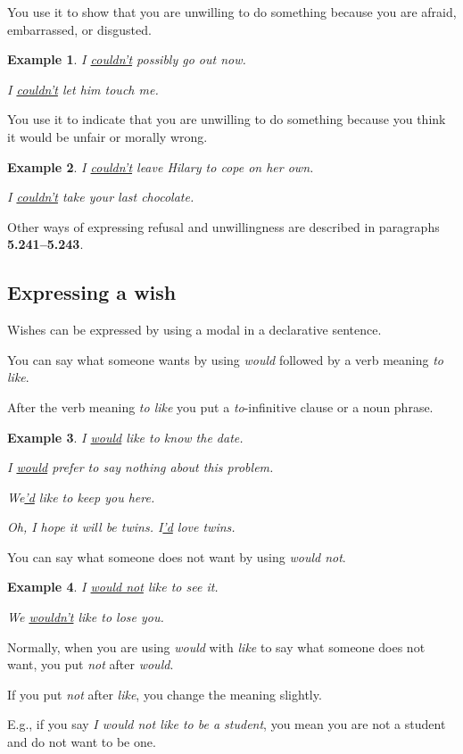 \documentclass[oneside]{book}
\numberwithin{equation}{section}
\newtheorem{example}{Example}[section]
\begin{document}
%
You use it to show that you are unwilling to do something because you are afraid, embarrassed, or disgusted.
\begin{example}
    I \underline{couldn't} possibly go out now.
    
    I \underline{couldn't} let him touch me.
\end{example}
You use it to indicate that you are unwilling to do something because you think it would be unfair or morally wrong.
\begin{example}
    I \underline{couldn't} leave Hilary to cope on her own.
    
    I \underline{couldn't} take your last chocolate.
\end{example}
%
\noindent{} Other ways of expressing refusal and unwillingness are described in paragraphs \textbf{5.241--5.243}.

\subsection{Expressing a wish}
\noindent{} Wishes can be expressed by using a modal in a declarative sentence.

%
\noindent{} You can say what someone wants by using \textit{would} followed by a verb meaning \textit{to like}.

After the verb meaning \textit{to like} you put a \textit{to}-infinitive clause or a noun phrase.
\begin{example}
    I \underline{would} like to know the date.
    
    I \underline{would} prefer to say nothing about this problem.
    
    We\underline{'d} like to keep you here.
    
    Oh, I hope it will be twins. I\underline{'d} love twins.
\end{example}
%
\noindent{} You can say what someone does not want by using \textit{would not}.
\begin{example}
    I \underline{would not} like to see it.
    
    We \underline{wouldn't} like to lose you.
\end{example}
Normally, when you are using \textit{would} with \textit{like} to say what someone does not want, you put \textit{not} after \textit{would}.

If you put \textit{not} after \textit{like}, you change the meaning slightly.

%
E.g., if you say \textit{I would not like to be a student}, you mean you are not a student and do not want to be one.
\end{document}
